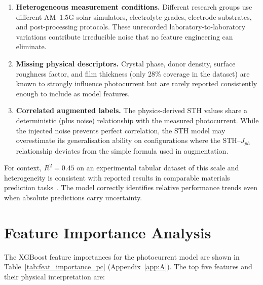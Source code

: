 \begin{enumerate}
  \item \textbf{Heterogeneous measurement conditions.}
        Different research groups use different AM~1.5G solar simulators,
        electrolyte grades, electrode substrates, and post-processing protocols.
        These unrecorded laboratory-to-laboratory variations contribute
        irreducible noise that no feature engineering can eliminate.

  \item \textbf{Missing physical descriptors.}
        Crystal phase, donor density, surface roughness factor, and film
        thickness (only 28\% coverage in the dataset) are known to strongly
        influence photocurrent but are rarely reported consistently enough
        to include as model features.

  \item \textbf{Correlated augmented labels.}
        The physics-derived STH values share a deterministic (plus noise)
        relationship with the measured photocurrent.
        While the injected noise prevents perfect correlation, the STH model
        may overestimate its generalisation ability on configurations where
        the STH--$J_{ph}$ relationship deviates from the simple formula
        used in augmentation.
\end{enumerate}

For context, $R^2 = 0.45$ on an experimental tabular dataset of this scale and
heterogeneity is consistent with reported results in comparable materials
prediction tasks~\cite{wu2019machine}. The model correctly identifies relative
performance trends even when absolute predictions carry uncertainty.

\section{Feature Importance Analysis}

The XGBoost feature importances for the photocurrent model are shown in
Table~\ref{tab:feat_importance_pc} (Appendix~\ref{app:A}).
The top five features and their physical interpretation are:

